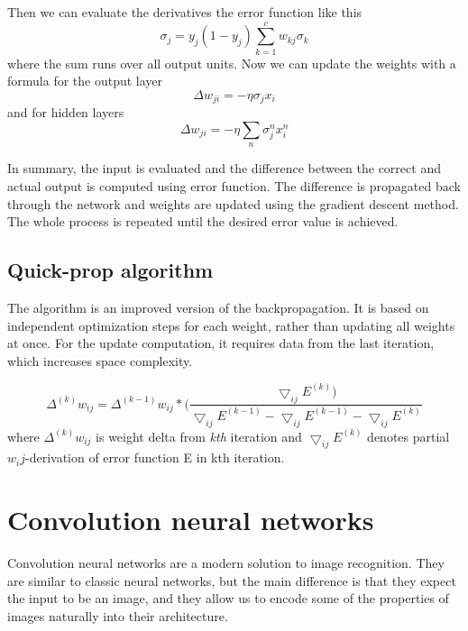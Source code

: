 Then we can evaluate the derivatives the error function like this
\begin{equation*}
\sigma_{j} = y_{j}(1-y_{j}) \sum_{k=1}^{c} w_{kj} \sigma_{k}
\end{equation*}
where the sum runs over all output units. Now we can update the weights with a formula for the output layer
\begin{equation*}
\Delta w_{ji} = - \eta \sigma_{j} x_{i}
\end{equation*}
and for hidden layers
\begin{equation*}
\Delta w_{ji} =  - \eta \sum_{n} \sigma_{j}^{n} x_{i}^{n}
\end{equation*}

In summary, the input is evaluated and the difference between the correct and actual output is computed using error function. The difference is propagated back through the network and weights are updated using the gradient descent method. The whole process is repeated until the desired error value is achieved.

\subsection{Quick-prop algorithm}
The algorithm is an improved version of the backpropagation. It is based on independent optimization steps for each weight, rather than updating all weights at once. For the update computation, it requires data from the last iteration, which increases space complexity. 

\begin{equation*}
\Delta ^{(k)} w_{ij} = \Delta^{(k-1)} w_{ij}*(\frac {\bigtriangledown_{ij} E^{(k)})} {\bigtriangledown_{ij} E^{(k-1)} - \bigtriangledown_{ij} E^(k-1) - \bigtriangledown_{ij} E^{(k)} }
\end{equation*}
where $\Delta ^{(k)} w_{ij}$ is weight delta from \emph{kth} iteration and $\bigtriangledown_{ij} E^(k)$ denotes partial $w_ij$-derivation of error function E in kth iteration.

\section{Convolution neural networks}
Convolution neural networks are a modern solution to image recognition. They are similar to classic neural networks, but the main difference is that they expect the input to be an image, and they allow us to encode some of the properties of images naturally into their architecture.

